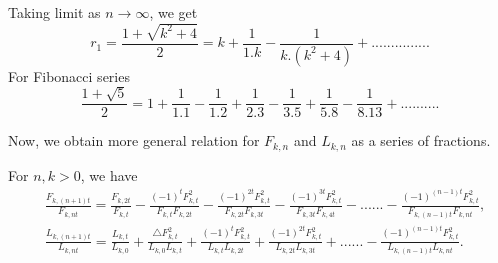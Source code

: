  \begin{remark}
 Taking limit as ${n \rightarrow \infty} $, we get
 $$r_{1} = \frac{1+ \sqrt{k^2 + 4}}{2} = k+ \dfrac{1}{1. k} -\frac{1}{k .(k^2 +4)}+...............$$
 For Fibonacci series 
 $$\dfrac{1 +\sqrt{5}}{2}= 1+ \dfrac{1}{1. 1}- \dfrac{1}{1. 2}+ \dfrac{1}{2. 3}- \dfrac{1}{3. 5}+ \dfrac{1}{5. 8} - \dfrac{1}{8. 13}+..........$$
 \end{remark}
\noindent Now, we obtain more general relation for $F_{k,n}$ and $L_{k,n}$ as a series of fractions.
  \begin{theorem} For $ n, k > 0$, we have
  \begin{align*}
  &\frac{F_{k,(n+1)t}}{F_{k,nt}} = \frac{F_{k,2t}}{F_{k,t}} - \frac{(-1)^t F_{k,t}^2}{F_{k,t}F_{k,2t}}- \frac{(-1)^{2t}F_{k,t}^2}{F_{k,2t}F_{k,3t}}- \frac{(-1)^{3t}F_{k,t}^2}{F_{k,3t}F_{k,4t}} - ......-  \frac{(-1)^{(n-1)t}F_{k,t}^2}{F_{k,(n-1)t}F_{k,nt}},\\
&\frac{L_{k,(n+1)t}}{L_{k,nt}} = \frac{L_{k,t}}{L_{k,0}} +\frac{\triangle F_{k,t}^2}{L_{k,0}L_{k,t}}+ \frac{(-1)^t F_{k,t}^2}{L_{k,t}L_{k,2t}} + \frac{(-1)^{2t}F_{k,t}^2}{L_{k,2t}L_{k,3t}}+......-  \frac{(-1)^{(n-1)t}F_{k,t}^2}{L_{k,(n-1)t}L_{k,nt}}.
 \end{align*}
 \end{theorem}
